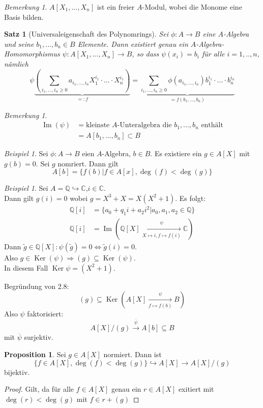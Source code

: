 \documentclass[10pt,a4paper]{article}
\newcommand{\Q}{\ensuremath{\mathbb{Q}}}
\newcommand{\C}{\ensuremath{\mathbb{C}}}
\newcommand{\ol}[1]{\overline{#1}}
\newcounter{thm}[section]
\theoremstyle{definition}
\newtheorem{prop}[thm]{Proposition}
\theoremstyle{plain}
\newtheorem{satz}[thm]{Satz}
\theoremstyle{remark}
\newtheorem{bem}[thm]{Bemerkung}
\newtheorem{exm}[thm]{Beispiel}
\begin{document}
\setcounter{section}{2}
\setcounter{thm}{7}


\begin{bem}
	$A[X_1,...,X_n]$ ist ein freier $A$-Modul, wobei die Monome eine Basis bilden.
\end{bem}
\begin{satz}[Universaleigenschaft des Polynomrings]
	Sei $\phi:A\rightarrow B$ eine $A$-Algebra und seine $b_1,...,b_n\in B$ Elemente. Dann existiert genau ein $A$-Algebra-Homomorphismus $\psi:A[X_1,...,X_n]\rightarrow B$, so dass $\psi(x_i)=b_i$ für alle $i=1,..,n$, nämlich
	\[\psi\underbrace{\left(\sum_{i_1,...,i_n\ge 0}a_{i_1,...,i_n}X_1^{i_1}\cdot...\cdot X_n^{i_1}\right)}_{=:f}=\underbrace{\sum_{i_1,...,i_n\ge 0}\phi(a_{i_1,...,i_n})b_1^{i_1}\cdot...\cdot b_n^{i_n}}_{=f(b_1,...,b_n)}\]
\end{satz}
\begin{bem}
	\begin{align*}
	\operatorname{Im}(\psi)&=\text{kleinste $A$-Unteralgebra die $b_1,...,b_n$ enthält}\\
	&=A[b_1,...,b_n]\subset B
	\end{align*}
\end{bem}
\begin{exm}
	Sei $\phi:A\rightarrow B$ eien $A$-Algebra, $b\in B$. Es existiere ein $g\in A[X]$ mit $g(b)=0$. Sei $g$ nomriert. Dann gilt\\
	\[A[b]=\{f(b)|f\in A[x],\deg(f)<\deg (g)\}\]
\end{exm}
\begin{exm}
	Sei $A=\Q\hookrightarrow\C$,$i\in \C$. \\
	Dann gilt $g(i)=0$ wobei $g=X^3+X=X(X^2+1)$. Es folgt:
	\begin{align*}
	\Q[i]&=\{a_0+q_1i+a_2i^2|a_0,a_1,a_2\in\Q\}\\
	\Q[i]&=\operatorname{Im}(\Q[X]\xrightarrow[X\mapsto i, f\mapsto f(i)]{\psi}\C)
	\end{align*}
	Dann $\tilde{g}\in\Q[X]: \psi(\tilde{g})=0\Leftrightarrow \tilde{g}(i)=0$.\\
	Also $g\in\operatorname{Ker}(\psi)\Rightarrow (g)\subseteq\operatorname{Ker}(\psi)$.\\
In diesem Fall $\operatorname{Ker}\psi=(X^2+1)$.\\
\end{exm}
Begründung von 2.8:
\[(g)\subseteq\operatorname{Ker}\left(A[X]\xrightarrow[f\mapsto f(b)]{\psi}B\right)\]
Also $\psi$ faktorisiert:
\[A[X]/(g)\xrightarrow{\ol{\psi}}A[b]\subseteq B\]
mit $\ol{\psi}$ surjektiv.
\begin{prop}
	Sei $g\in A[X]$ normiert. Dann ist\[\{f\in A[X],\deg(f)<\deg(g)\}\hookrightarrow A[X]\rightarrow A[X]/(g)\]
	bijektiv.
\end{prop}
\begin{proof}
	Gilt, da für alle $f\in A[X]$ genau ein $r\in A[X]$ exitiert mit $\deg(r)<\deg(g)$ mit $f\in r+(g)$
\end{proof}
\end{document}
